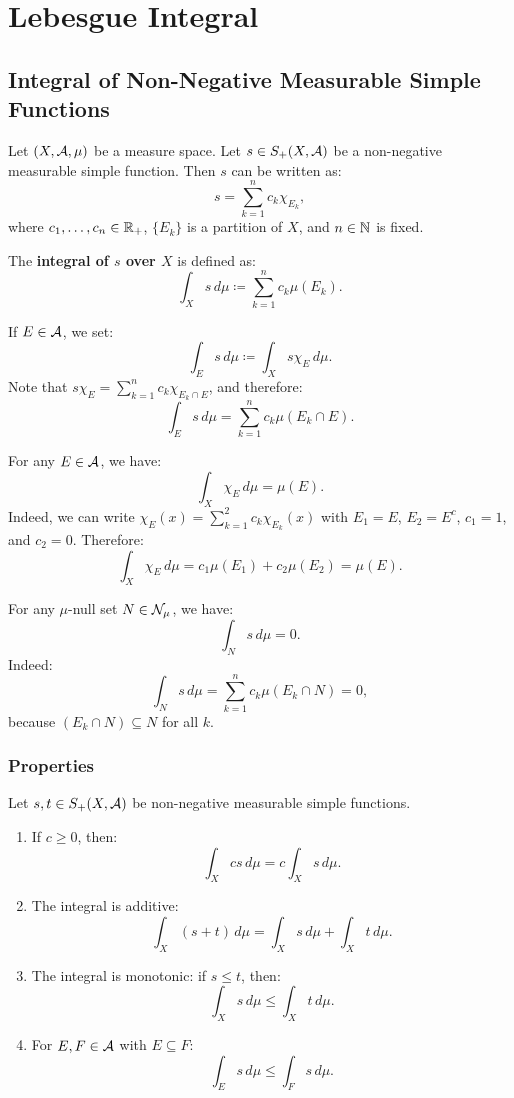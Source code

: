 \section{Lebesgue Integral}

\subsection{Integral of Non-Negative Measurable Simple Functions}

Let $(X, \mathcal{A}, \mu)$ be a measure space. Let $s \in S_+(X, \mathcal{A})$ be a non-negative measurable simple function. Then $s$ can be written as:
\[
s = \sum_{k=1}^{n} c_k \chi_{E_k},
\]
where $c_1, \dots, c_n \in \mathbb{R}_+$, $\{E_k\}$ is a partition of $X$, and $n \in \mathbb{N}$ is fixed.

\begin{definition}
The \textbf{integral of $s$ over $X$} is defined as:
\[
\int_X s \, d\mu \coloneqq \sum_{k=1}^{n} c_k \mu(E_k).
\]
\end{definition}

If $E \in \mathcal{A}$, we set:
\[
\int_E s \, d\mu \coloneqq \int_X s\chi_E \, d\mu.
\]
Note that $s\chi_E = \sum_{k=1}^{n} c_k \chi_{E_k \cap E}$, and therefore:
\[
\int_E s \, d\mu = \sum_{k=1}^{n} c_k \mu(E_k \cap E).
\]

\begin{remark}
For any $E \in \mathcal{A}$, we have:
\[
\int_X \chi_E \, d\mu = \mu(E).
\]
Indeed, we can write $\chi_E(x) = \sum_{k=1}^{2} c_k \chi_{E_k}(x)$ with $E_1 = E$, $E_2 = E^c$, $c_1 = 1$, and $c_2 = 0$. Therefore:
\[
\int_X \chi_E \, d\mu = c_1 \mu(E_1) + c_2 \mu(E_2) = \mu(E).
\]
\end{remark}

\begin{remark}
For any $\mu$-null set $N \in \mathcal{N}_\mu$, we have:
\[
\int_N s \, d\mu = 0.
\]
Indeed:
\[
\int_N s \, d\mu = \sum_{k=1}^{n} c_k \mu(E_k \cap N) = 0,
\]
because $(E_k \cap N) \subseteq N$ for all $k$.
\end{remark}

\clearpage
\subsubsection{Properties}

Let $s, t \in S_+(X, \mathcal{A})$ be non-negative measurable simple functions.

\begin{enumerate}
    \item If $c \geq 0$, then:
    \[
    \int_X cs \, d\mu = c \int_X s \, d\mu.
    \]
    
    \item The integral is additive:
    \[
    \int_X (s + t) \, d\mu = \int_X s \, d\mu + \int_X t \, d\mu.
    \]
    
    \item The integral is monotonic: if $s \leq t$, then:
    \[
    \int_X s \, d\mu \leq \int_X t \, d\mu.
    \]
    
    \item For $E, F \in \mathcal{A}$ with $E \subseteq F$:
    \[
    \int_E s \, d\mu \leq \int_F s \, d\mu.
    \]
\end{enumerate}

